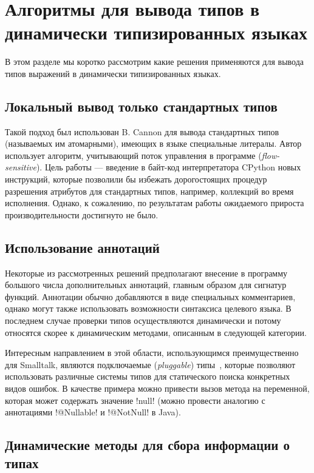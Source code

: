\section{Алгоритмы для вывода типов в динамически типизированных языках}

В этом разделе мы коротко рассмотрим какие решения применяются для вывода
типов выражений в динамически типизированных языках.

\subsection{Локальный вывод только стандартных типов}

Такой подход был использован B. Cannon для вывода стандартных типов (называемых им
атомарными), имеющих в языке специальные литералы. Автор использует алгоритм,
учитывающий поток управления в программе (\emph{flow-sensitive}). Цель работы
--- введение в байт-код интерпретатора CPython новых инструкций, которые
позволили бы избежать дорогостоящих процедур разрешения атрибутов для
стандартных типов, например, коллекций во время исполнения. Однако, к сожалению,
по результатам работы ожидаемого прироста производительности достигнуто не было.

\subsection{Использование аннотаций}

Некоторые из рассмотренных решений предполагают внесение в программу большого
числа дополнительных аннотаций, главным образом для сигнатур функций. Аннотации
обычно добавляются в виде специальных комментариев, однако могут также
использовать возможности синтаксиса целевого языка. В последнем случае проверки
типов осуществляются динамически и потому относятся скорее к динамическим
методами, описанным в следующей категории.

Интересным направлением в этой области, использующимся преимущественно для
Smalltalk, являются подключаемые (\emph{pluggable}) типы~\cite{Haldiman2009},
которые позволяют использовать различные системы типов для статического поиска
конкретных видов ошибок. В качестве примера можно привести вызов метода на
переменной, которая может содержать значение !null! (можно провести аналогию с
аннотациями !@Nullable! и !@NotNull! в Java). 

\subsection{Динамические методы для сбора информации о типах}
\label{sec:dynamic-checks}

